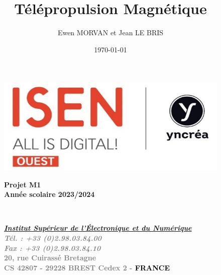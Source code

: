 \documentclass{article}
\title{Télépropulsion Magnétique}
\author{Ewen MORVAN et Jean LE BRIS}
\date{\today}
\begin{document}

\setcounter{page}{0}



\begin{figure}[t]
    \begin{minipage}[t]{0.475\linewidth}
        \vspace{-1.6cm}
        \includegraphics[width=\linewidth]{Images/IsenLogo.jpg}
    \end{minipage}%
    \hfill
    \begin{minipage}[t]{0.55\linewidth}
        \vspace{0.5cm} %
        \hspace{2.4cm}
        \centering
        \fontsize{23}{26}\selectfont\bfseries\textbf{Projet M1}\\
        \hspace{1.9cm}
        \fontsize{14}{18}\selectfont\bfseries\textbf{Année scolaire 2023/2024}
    \end{minipage}\\
    \begin{minipage}[t]{0.55\linewidth}
        \vspace{-0.1cm}
        \hspace{-1.0cm}
        \centering
        \fontsize{10}{18}\selectfont\bfseries\textbf{\underline{\textit{Institut Supérieur de l’Électronique et du Numérique}}}
        \\
        \hspace{-0.5cm}
        \fontsize{10}{7}\selectfont
        \textcolor{gray}{\textit{Tél. : +33 (0)2.98.03.84.00}}\\
        \textcolor{gray}{\textit{Fax : +33 (0)2.98.03.84.10}}\\
        \fontsize{12}{7}\selectfont
        \textcolor{gray}{20, rue Cuirassé Bretagne}\\
        \fontsize{10}{7}\selectfont
        \hspace{-0.5cm}
        \textcolor{gray}{CS 42807 - 29228 BREST Cedex 2 - }{\bfseries\textbf{\textcolor{black}{FRANCE}}}
    \end{minipage}
\end{figure}
\end{document}
